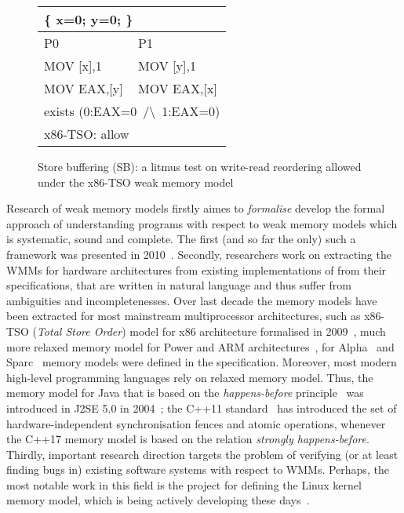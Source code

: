 \begin{figure}
\small \ttfamily
\begin{tabular}{ |l|l| }
\hline
\multicolumn{2}{|l|}{ \{ x=0; y=0; \}} \tabularnewline \hline
P0 & P1 \\ \hline
MOV [x],1 & MOV [y],1 \\
MOV EAX,[y] & MOV EAX,[x] \\
\hline
\multicolumn{2}{|l|}{exists (0:EAX=0~/\textbackslash~1:EAX=0)} \tabularnewline
\hline
\multicolumn{2}{|l|}{x86-TSO: allow} \tabularnewline
\hline

\end{tabular}
\caption{Store buffering (SB): a litmus test on write-read reordering allowed under the x86-TSO weak memory model}
\label{simple_wmm_x86}
\end{figure}

Research of weak memory models firstly aimes to \textit{formalise} develop the formal approach of understanding programs with respect to weak memory models which is systematic, sound and complete. The first (and so far the only) such a framework was presented in 2010~\cite{alglave2010shared}.
%
Secondly, researchers work on extracting the WMMs for hardware architectures from existing implementations of from their specifications, that are written in natural language and thus suffer from ambiguities and incompletenesses. Over last decade the memory models have been extracted for most mainstream multiprocessor architectures, such as x86-TSO (\textit{Total Store Order}) model for x86 architecture formalised in 2009~\cite{owens2009better}, much more relaxed memory model for Power and ARM architectures~\cite{alglave2009semantics,sarkar2011understanding}, for Alpha~\cite{?} and Sparc~\cite{?} memory models were defined in the specification. Moreover, most modern high-level programming languages rely on relaxed memory model. Thus, the memory model for Java that is based on the \textit{happens-before} principle~\cite{lamport1978time} was introduced in J2SE 5.0 in 2004~\cite{manson2005java}; the C++11 standard~\cite{?} has introduced the set of hardware-independent synchronisation fences and atomic operations, whenever the C++17 memory model is based on the relation \textit{strongly happens-before}.
Thirdly, important research direction targets the problem of verifying (or at least finding bugs in) existing software systems with respect to WMMs. Perhaps, the most notable work in this field is the project for defining the Linux kernel memory model, which is being actively developing these days~\cite{kernel1}.

